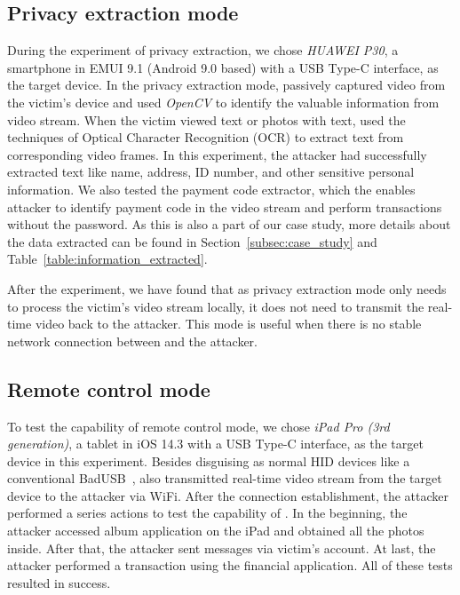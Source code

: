 \subsection{Privacy extraction mode}

During the experiment of privacy extraction, we chose \textit{HUAWEI P30}, a
smartphone in EMUI 9.1 (Android 9.0 based) with a USB Type-C interface, as the
target device.  In the privacy extraction mode, \tool passively captured video
from the victim's device and used \textit{OpenCV} to identify the valuable
information from video stream.  When the victim viewed text or photos with
text, \tool used the techniques of Optical Character Recognition (OCR) to
extract text from corresponding video frames.  In this experiment, the attacker had
successfully extracted text like name, address, ID number, and other sensitive
personal information. We also tested the payment code extractor, which the enables
attacker to identify payment code in the video stream and perform transactions
without the password. As this is also a part of our case study, more details about
the data extracted can be found in Section~\ref{subsec:case_study} and
Table~\ref{table:information_extracted}.

After the
experiment, we have found that as privacy extraction mode only needs to
process the victim's video stream locally, it does not need to transmit the real-time video back to the attacker. This mode is useful when there is no stable network connection between \tool and the attacker.

\subsection{Remote control mode}

To test the capability of remote control mode, we chose \textit{iPad Pro (3rd
	generation)}, a tablet in iOS 14.3 with a USB Type-C interface, as the target
device in this experiment.  Besides disguising as normal HID devices like a
conventional BadUSB~\cite{badusb}, \tool also transmitted real-time video
stream from the target device to the attacker via WiFi.  After the connection
establishment, the attacker performed a series actions to test the capability of
\tool. In the beginning, the attacker accessed album application on the iPad and
obtained all the photos inside. After that, the attacker sent messages via victim's
account. At last, the attacker performed a transaction using the
financial application. All of these tests resulted in success.

